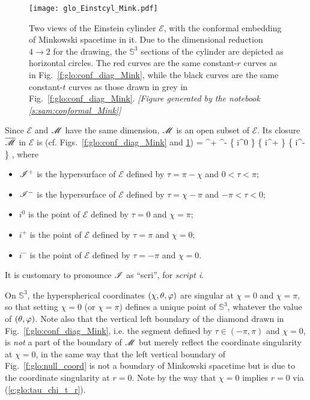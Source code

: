 \begin{figure}
\centerline{\texttt{[image: glo\_Einstcyl\_Mink.pdf]}}
\caption[]{\label{f:glo:Einstcyl_Mink}\footnotesize
Two views of the Einstein cylinder $\mathscr{E}$, with the conformal embedding of
Minkowski spacetime in it. Due to the dimensional reduction $4 \to 2$ for
the drawing, the
$\mathbb{S}^3$ sections of the cylinder are depicted as horizontal circles.
The red curves are the same constant-$r$ curves
as in Fig.~\ref{f:glo:conf_diag_Mink}, while the black curves are
the same constant-$t$ curves as those drawn in grey in Fig.~\ref{f:glo:conf_diag_Mink}.
\textsl{[Figure generated by the notebook \ref{s:sam:conformal_Mink}]}
}
\end{figure}

Since $\mathscr{E}$ and $\mathscr{M}$ have the same dimension, $\mathscr{M}$ is an open subset of $\mathscr{E}$.
Its closure $\overline{\mathscr{M}}$ in $\mathscr{E}$ is (cf.
Figs.~\ref{f:glo:conf_diag_Mink} and \ref{f:glo:Einstcyl_Mink})
\be
    \overline{\M} = \M \cup \scri^+ \cup \scri^- \cup \left\{ i^0 \right\} \cup
            \left\{ i^+ \right\} \cup \left\{ i^- \right\} ,
\ee
where
\begin{itemize}
\item $\mathscr{I}^+$ is the hypersurface of $\mathscr{E}$ defined by
$\tau = \pi - \chi$ and $0 < \tau < \pi$;
\item $\mathscr{I}^-$ is the hypersurface of $\mathscr{E}$ defined by
$\tau = \chi - \pi $ and $-\pi  < \tau < 0$;
\item $i^0$ is the point of $\mathscr{E}$ defined by $\tau=0$ and $\chi=\pi$;
\item $i^+$ is the point of $\mathscr{E}$ defined by $\tau=\pi$ and $\chi=0$;
\item $i^-$ is the point of $\mathscr{E}$ defined by $\tau=-\pi$ and $\chi=0$.
\end{itemize}
It is customary to pronounce $\mathscr{I}$ as ``scri'', for \emph{script i}.

\begin{remark}
On $\mathbb{S}^3$, the hyperspherical coordinates $(\chi,\theta,\varphi)$
are singular at $\chi=0$ and $\chi=\pi$, so that setting $\chi=0$ (or $\chi=\pi$)
defines a unique point of $\mathbb{S}^3$, whatever the value of $(\theta,\varphi)$.
Note also that the vertical left boundary of the diamond drawn in
Fig.~\ref{f:glo:conf_diag_Mink}, i.e. the segment defined by
$\tau\in(-\pi,\pi)$ and $\chi=0$, is \emph{not} a part of the boundary
of $\mathscr{M}$ but merely reflect the coordinate singularity at $\chi=0$, in the same
way that the left vertical boundary of Fig.~\ref{f:glo:null_coord}
is not a boundary of Minkowski spacetime but is
due to the coordinate singularity at $r=0$. Note by the way that
$\chi=0$ implies $r=0$ via (\ref{e:glo:tau_chi_t_r}).
\end{remark}

